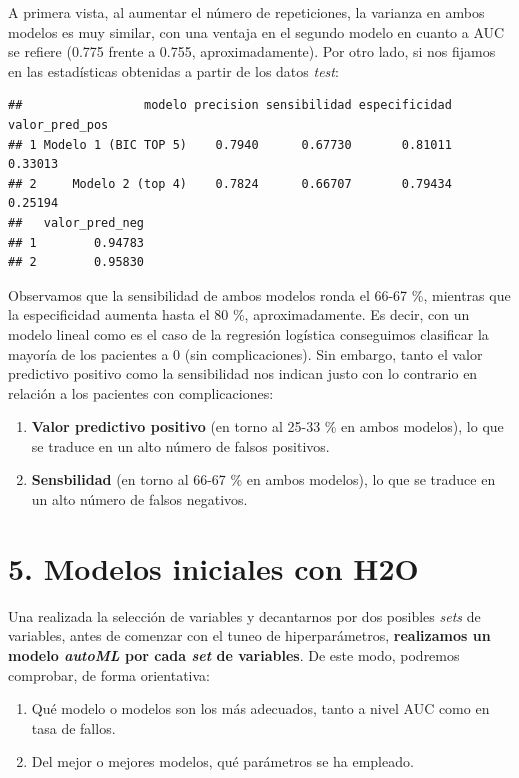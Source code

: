 \documentclass[
]{article}
\providecommand{\tightlist}{%
  \setlength{\itemsep}{0pt}\setlength{\parskip}{0pt}}
\begin{document}
A primera vista, al aumentar el número de repeticiones, la varianza en
ambos modelos es muy similar, con una ventaja en el segundo modelo en
cuanto a AUC se refiere (0.775 frente a 0.755, aproximadamente). Por
otro lado, si nos fijamos en las estadísticas obtenidas a partir de los
datos \emph{test}:

\begin{verbatim}
##                 modelo precision sensibilidad especificidad valor_pred_pos
## 1 Modelo 1 (BIC TOP 5)    0.7940      0.67730       0.81011        0.33013
## 2     Modelo 2 (top 4)    0.7824      0.66707       0.79434        0.25194
##   valor_pred_neg
## 1        0.94783
## 2        0.95830
\end{verbatim}

Observamos que la sensibilidad de ambos modelos ronda el 66-67 \%,
mientras que la especificidad aumenta hasta el 80 \%, aproximadamente.
Es decir, con un modelo lineal como es el caso de la regresión logística
conseguimos clasificar la mayoría de los pacientes a 0 (sin
complicaciones). Sin embargo, tanto el valor predictivo positivo como la
sensibilidad nos indican justo con lo contrario en relación a los
pacientes con complicaciones:

\begin{enumerate}
\def\labelenumi{\arabic{enumi}.}
\item
  \textbf{Valor predictivo positivo} (en torno al 25-33 \% en ambos
  modelos), lo que se traduce en un alto número de falsos positivos.
\item
  \textbf{Sensbilidad} (en torno al 66-67 \% en ambos modelos), lo que
  se traduce en un alto número de falsos negativos.
\end{enumerate}

\hypertarget{modelos-iniciales-con-h2o}{%
\section{5. Modelos iniciales con H2O}\label{modelos-iniciales-con-h2o}}

Una realizada la selección de variables y decantarnos por dos posibles
\emph{sets} de variables, antes de comenzar con el tuneo de
hiperparámetros, \textbf{realizamos un modelo \emph{autoML} por cada
\emph{set} de variables}. De este modo, podremos comprobar, de forma
orientativa:

\begin{enumerate}
\def\labelenumi{\arabic{enumi}.}
\tightlist
\item
  Qué modelo o modelos son los más adecuados, tanto a nivel AUC como en
  tasa de fallos.
\item
  Del mejor o mejores modelos, qué parámetros se ha empleado.
\end{enumerate}
\end{document}
